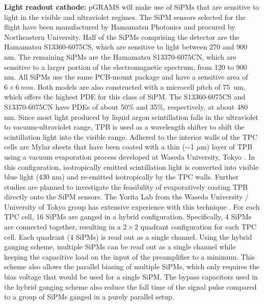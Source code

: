 \noindent\textbf{Light readout cathode:} pGRAMS will make use of \ac{SiPM}s that are sensitive to light in the visible and ultraviolet regimes. The SiPM sensors selected for the flight have been manufactured by Hamamatsu Photonics and procured by Northeastern University. Half of the SiPMs comprising the detector are the Hamamatsu S13360-6075CS, which are sensitive to light between 270 and 900 nm. The remaining SiPMs are the Hamamatsu S13370-6075CN, which are sensitive to a larger portion of the electromagnetic spectrum, from 120 to 900 nm. All SiPMs use the same PCB-mount package and have a sensitive area of $6 \times 6~mm$. Both models are also constructed with a microcell pitch of 75~um, which offers the highest \ac{PDE} for this class of SiPM. The S13360-6075CS and S13370-6075CN have PDEs of about 50\% and 35\%, respectively, at about 480 nm.
Since most light produced by liquid argon scintillation falls in the ultraviolet to vacuum-ultraviolet range, \ac{TPB} is used as a wavelength shifter to shift the scintillation light into the visible range. Adhered to the interior walls of the TPC cells are Mylar sheets that have been coated with a thin ($\sim$1 $\mu$m) layer of \ac{TPB} using a vacuum evaporation process developed at Waseda University, Tokyo \cite{Aoyama_2020}. In this configuration, isotropically emitted scintillation light is converted into visible blue light (430 nm) and re-emitted isotropically by the TPC walls. Further studies are planned to investigate the feasibility of evaporatively coating TPB directly onto the SiPM sensors. The Yorita Lab from the Waseda University / University of Tokyo group has extensive experience with this technique \cite{yoritakohei2025}.
For each TPC cell, 16 SiPMs are ganged in a hybrid configuration. Specifically, 4 SiPMs are connected together, resulting in a $2\times2$ quadrant configuration for each TPC cell. Each quadrant (4 SiPMs) is read out as a single channel.
Using the hybrid ganging scheme, multiple SiPMs can be read out as a single channel while keeping the capacitive load on the input of the preamplifier to a minimum. This scheme also allows the parallel biasing of multiple SiPMs, which only requires the bias voltage that would be used for a single SiPM. The bypass capacitors used in the hybrid ganging scheme also reduce the fall time of the signal pulse compared to a group of SiPMs ganged in a purely parallel setup.

